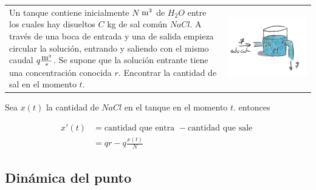 \begin{problema}
\begin{tabular}{m{5cm} m{4.5cm}}
 Un tanque contiene inicialmente $N$ $\hbox{m}^3$ de $H_2O$ entre los cuales hay disueltos $C$ kg de sal común
 $NaCl$. A través de una boca de entrada y una de salida empieza circular la solución, entrando y saliendo con el mismo caudal $q\frac{\hbox{m}^3}{s}$. Se supone que
 la solución entrante tiene una concentración conocida $r$. Encontrar la cantidad de sal en el momento $t$. &
  \includegraphics[scale=.1]{imagenes/tanque.jpg} \\
\end{tabular}
\end{problema}


 Sea $x(t)$ la cantidad de $NaCl$ en el tanque en el momento $t$. entonces

\[\begin{split}
   x'(t)&=\text{cantidad que entra }-\text{cantidad que sale }\\
          &=qr-q\frac{x(t)}{N}
  \end{split}
\]




\subsection{Dinámica del punto}

